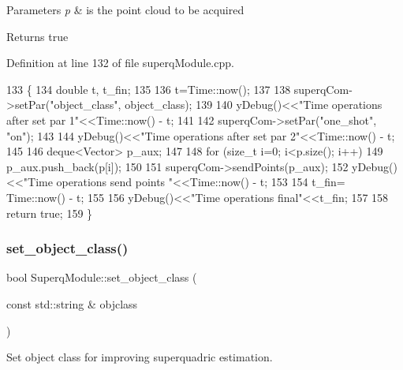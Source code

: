 \begin{DoxyParams}{Parameters}
{\em p} & is the point cloud to be acquired \\
\hline
\end{DoxyParams}
\begin{DoxyReturn}{Returns}
true 
\end{DoxyReturn}


Definition at line 132 of file superq\+Module.\+cpp.


\begin{DoxyCode}
133 \{
134     \textcolor{keywordtype}{double} t, t\_fin;  
135     
136     t=Time::now();
137 
138     superqCom->setPar(\textcolor{stringliteral}{"object\_class"}, object\_class);
139 
140     yDebug()<<\textcolor{stringliteral}{"Time operations  after set par 1"}<<Time::now() - t;
141 
142     superqCom->setPar(\textcolor{stringliteral}{"one\_shot"}, \textcolor{stringliteral}{"on"});
143 
144     yDebug()<<\textcolor{stringliteral}{"Time operations after set par 2"}<<Time::now() - t;
145 
146     deque<Vector> p\_aux;
147 
148     \textcolor{keywordflow}{for} (\textcolor{keywordtype}{size\_t} i=0; i<p.size(); i++)
149         p\_aux.push\_back(p[i]);
150 
151     superqCom->sendPoints(p\_aux);
152     yDebug()<<\textcolor{stringliteral}{"Time operations send points "}<<Time::now() - t;
153 
154     t\_fin= Time::now() - t;
155 
156     yDebug()<<\textcolor{stringliteral}{"Time operations  final"}<<t\_fin;
157 
158     \textcolor{keywordflow}{return} \textcolor{keyword}{true};
159 \}
\end{DoxyCode}
\mbox{\label{classSuperqModule_aa00f3e123ab12a0c65f864f2900c36e4}} 
\subsubsection{\texorpdfstring{set\+\_\+object\+\_\+class()}{set\_object\_class()}}
{\footnotesize\ttfamily bool Superq\+Module\+::set\+\_\+object\+\_\+class (\begin{DoxyParamCaption}\item[{const std\+::string \&}]{objclass }\end{DoxyParamCaption})\hspace{0.3cm}{\ttfamily [protected]}}



Set object class for improving superquadric estimation. 



